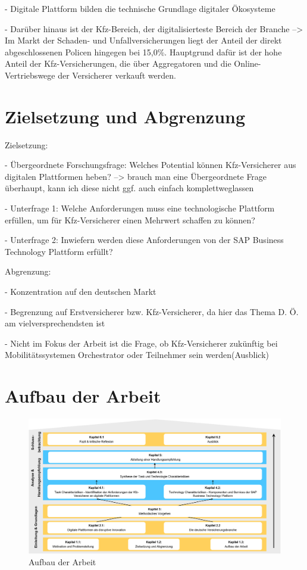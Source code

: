 -	Digitale Plattform bilden die technische Grundlage digitaler Ökosysteme

-	Darüber hinaus ist der Kfz-Bereich, der digitalisierteste Bereich der Branche --> Im Markt der Schaden- und Unfallversicherungen liegt der Anteil der direkt abgeschlossenen Policen hingegen bei 15,0\%. Hauptgrund dafür ist der hohe Anteil der Kfz-Versicherungen, die über Aggregatoren und die Online-Vertriebswege der Versicherer verkauft werden.










\newpage
\section{Zielsetzung und Abgrenzung}

Zielsetzung:

-	Übergeordnete Forschungsfrage: Welches Potential können Kfz-Versicherer aus digitalen Plattformen heben? --> brauch man eine Übergeordnete Frage überhaupt, kann ich diese nicht ggf. auch einfach komplettweglassen

-	Unterfrage 1: Welche Anforderungen muss eine technologische Plattform erfüllen, um für Kfz-Versicherer einen Mehrwert schaffen zu können?

-	Unterfrage 2: Inwiefern werden diese Anforderungen von der SAP Business Technology Plattform erfüllt?


Abgrenzung:

-	Konzentration auf den deutschen Markt

-	Begrenzung auf Erstversicherer bzw. Kfz-Versicherer, da hier das Thema D. Ö. am vielversprechendsten ist

-	Nicht im Fokus der Arbeit ist die Frage, ob Kfz-Versicherer zukünftig bei Mobilitätssystemen Orchestrator oder Teilnehmer sein werden(Ausblick)


\newpage
\section{Aufbau der Arbeit}

\begin{figure}[h]
    \centering
    \includegraphics[width=1\textwidth]{img/Aufbau_der_Arbeit.jpg}
    \caption[Aufbau der Arbeit]{Aufbau der Arbeit\autocite{Aufbau}}
    \label{fig:Aufbau}
\end{figure}

\newpage